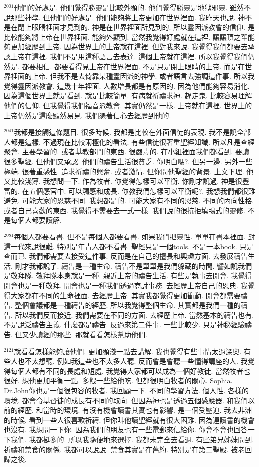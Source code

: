 \documentclass{book}
\begin{document}
$^{2001}$他們的好處是.
他們覺得勝靈是比較外顯的.
他們覺得勝靈是地獄邪靈.
雖然不說那些神學.
但他們的好處是.
他們能夠將上帝更加在世界裡面.
我昨天也說.
神不是在閉上眼睛裡面才見到的.
神是在世界裡面所見到的.
所以靈因派教會的信仰.
是比較能夠將上帝在世界裡面.
能夠外顯到.
當然我覺得好處就在這裡.
讓讓頂之輩能夠更加經歷到上帝.
因為世界上的上帝就在這裡.
但對我來說.
我覺得我們都要去承認上帝在這裡.
我們不是用這種語言去表達.
這個上帝就在這裡.
所以我覺得我們仍然是.
都要相信.
都要看得見上帝在世界裡面.
不是只是閉上眼睛的上帝.
而是在世界裡面的上帝.
但我不是去倚靠某種靈因派的神學.
或者語言去強調這件事.
所以我覺得靈因派教會.
這幾十年裡面.
人數增長都是有原因的.
因為他們能夠容易消化.
因為這個世界上就是看到.
就是比較簡單.
有病就祈禱求神.
趕走鬼.
比較容易理解他們的信仰.
但我覺得我們福音派教會.
其實仍然是一樣.
上帝就在這裡.
世界上的上帝仍然是這麼顯然易見.
我們憑著信心去經歷到他的.

$^{2041}$我都是接觸這條題目.
很多時候.
我都是比較在外面信徒的表現.
我不是說全部人都是這樣.
不過現在比較兩極化的看法.
有些信徒很著重聖經知識.
所以凡是查經聚會.
主要學習的.
或者基教部門的東西.
很嚴毒的.
在小組裡面我們都看到.
要讀很多聖經.
但他們又承認.
他們的禱告生活很貧乏.
你明白嗎?.
但另一邊.
另外一些極端.
很著重感性.
追求祈禱的興奮.
或者激情.
但你問他聖經的背景.
上文下理.
他又比較淺薄.
我想問一下.
作為牧者.
你覺得怎樣可以平衡.
你剛才說過.
神是很豐富的.
在五個感官中.
可以觸感和成長.
你教我們怎樣可以平衡呢?.
我想我們都很難避免.
可能大家的恩慈不同.
我想都是的.
可能大家有不同的恩慈.
不同的內向性格.
或者自己喜歡的東西.
我覺得不需要去一式一樣.
我們說的很抗拒填鴨式的靈修.
不是每個人都要讀解.

$^{2081}$每個人都要看書.
但不是每個人都要看書.
如果我們把靈性.
單單在書本裡面.
對這一代來說很難.
特別是年青人都不看書.
聖經只是一個tools.
不是一本book.
只是查而已.
我們都需要去接受這件事.
反而是在自己的擅長和興趣方面.
去發展禱告生活.
剛才我都說了.
禱告是一種生命.
禱告不是單單是我們躲藏的時間.
譬如說我們是敬拜隊.
敬拜隊本身就是一種.
親近上帝的禱告生活.
有些是執事去開會.
我覺得開會也是一種敬拜.
開會也是一種我們透過商討事務.
去經歷上帝自己的恩典.
我覺得大家都在不同的生命裡面.
去經歷上帝.
其實我都覺得更加衝動.
開會都需要禱告.
整個會議都是一種禱告的經歷.
所以我覺得整個生命.
其實都是我們一種的禱告.
所以我們反而接近.
我們需要在不同的方面.
去經歷上帝.
當然基本的禱告也有.
不是說泛禱告主義.
什麼都是禱告.
反過來第二件事.
一些比較少.
只是神秘經驗禱告.
但又少讀經的那些.
那就看看怎樣幫助他們.

$^{2121}$就看看怎樣能夠讓他們.
更加顯淺一點去講解.
我也覺得有些事情太過深奧.
有些人也不太想聽.
例如我這些也不太多人聽.
反而會是會聽一些懂得講座的人.
我覺得每個人都有不同的長處和短處.
我覺得大家都可以成為一個好教徒.
當然牧者也很好.
想他更加平衡一點.
多餵一些給他吃.
但都很明白牧者的關心.
Sophia.
Dr.John你也是一個很包容的牧者.
我回顧一下.
不同的學習方法.
個人性.
各樣的環境.
都會令基督徒的成長有不同的取向.
但因為神也是透過五個感應器.
和我們以前的經歷.
和當時的環境.
有沒有機會讀書其實也有影響.
是一個受壓迫.
我去非洲的時候.
看到一些人很喜歡祈禱.
但你叫他讀聖經就有很大困難.
因為連讀書的機會也沒有.
我想問一下你.
因為我們的朋友也有一些電郵來信給你.
你會不會也回答一下我們.
我都挺多的.
所以我隨便地來選擇.
我都未完全去看過.
有些弟兄姊妹問到.
祈禱和禁食的關係.
我都可以說說.
禁食其實是在舊約.
特別是在第二聖殿.
被老回歸之後.
\end{document}
